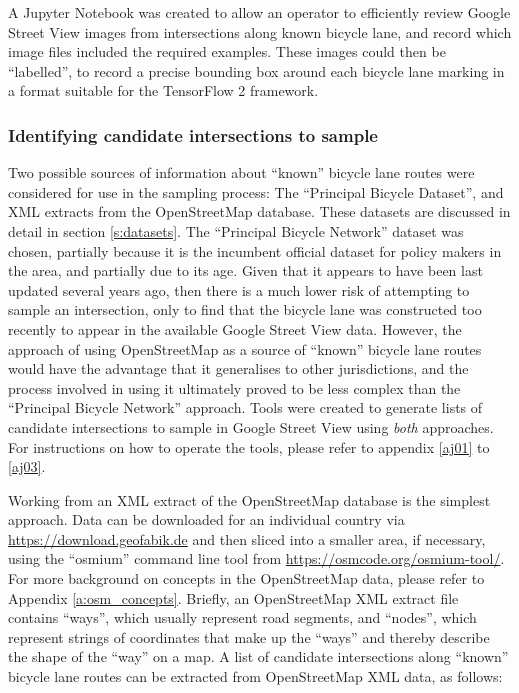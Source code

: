 \documentclass[11pt,twoside]{report}
\begin{document}
A Jupyter Notebook was created to allow an operator to efficiently review Google Street View images from intersections along known bicycle lane, and record which image files included the required examples.  These images could then be ``labelled'', to record a precise bounding box around each bicycle lane marking in a format suitable for the TensorFlow 2 framework.

\subsubsection{Identifying candidate intersections to sample}
\label{s:sample_candidates}

Two possible sources of information about ``known'' bicycle lane routes were considered for use in the sampling process:  The ``Principal Bicycle Dataset'', and XML extracts from the OpenStreetMap database.  These datasets are discussed in detail in section \ref{s:datasets}.  The ``Principal Bicycle Network'' dataset was chosen, partially because it is the incumbent official dataset for policy makers in the area, and partially due to its age.  Given that it appears to have been last updated several years ago, then there is a much lower risk of attempting to sample an intersection, only to find that the bicycle lane was constructed too recently to appear in the available Google Street View data.  However, the approach of using OpenStreetMap as a source of ``known'' bicycle lane routes would have the advantage that it generalises to other jurisdictions, and the process involved in using it ultimately proved to be less complex than the ``Principal Bicycle Network'' approach.  Tools were created to generate lists of candidate intersections to sample in Google Street View using \textit{both} approaches.  For instructions on how to operate the tools, please refer to appendix \ref{aj01} to \ref{aj03}.

Working from an XML extract of the OpenStreetMap database is the simplest approach.  Data can be downloaded for an individual country via \url{https://download.geofabik.de} and then sliced into a smaller area, if necessary, using the ``osmium'' command line tool from \url{https://osmcode.org/osmium-tool/}.  For more background on concepts in the OpenStreetMap data, please refer to Appendix \ref{a:osm_concepts}.  Briefly, an OpenStreetMap XML extract file contains ``ways'', which usually represent road segments, and ``nodes'', which represent strings of coordinates that make up the ``ways'' and thereby describe the shape of the ``way'' on a map.  A list of candidate intersections along ``known'' bicycle lane routes can be extracted from OpenStreetMap XML data, as follows:
\end{document}
